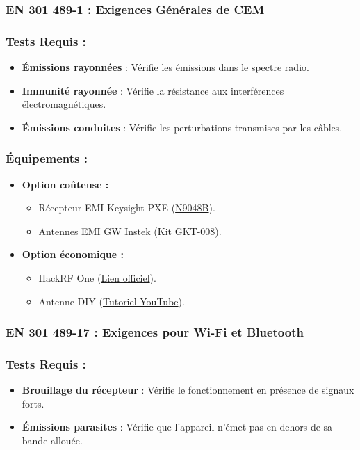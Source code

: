 \documentclass[a4paper,12pt]{article}
\begin{document}
\subsubsection{EN 301 489-1 : Exigences Générales de CEM}
\subsubsection*{Tests Requis :}
\begin{itemize}
    \item \textbf{Émissions rayonnées} : Vérifie les émissions dans le spectre radio.
    \item \textbf{Immunité rayonnée} : Vérifie la résistance aux interférences électromagnétiques.
    \item \textbf{Émissions conduites} : Vérifie les perturbations transmises par les câbles.
\end{itemize}

\subsubsection*{Équipements :}
\begin{itemize}
    \item \textbf{Option coûteuse :}
          \begin{itemize}
              \item Récepteur EMI Keysight PXE (\href{https://www.keysight.com/us/en/product/N9048B/pxe-emi-receiver-1-hz-44-ghz.html}{N9048B}).
              \item Antennes EMI GW Instek (\href{https://eleshop.fr/gw-instek-gkt-008-emi-probe-kit.html}{Kit GKT-008}).
          \end{itemize}
    \item \textbf{Option économique :}
          \begin{itemize}
              \item HackRF One (\href{https://greatscottgadgets.com/hackrf/one/}{Lien officiel}).
              \item Antenne DIY (\href{https://www.youtube.com/watch?v=2xy3Hm1_ZqI}{Tutoriel YouTube}).
          \end{itemize}
\end{itemize}

\subsubsection{EN 301 489-17 : Exigences pour Wi-Fi et Bluetooth}
\subsubsection*{Tests Requis :}
\begin{itemize}
    \item \textbf{Brouillage du récepteur} : Vérifie le fonctionnement en présence de signaux forts.
    \item \textbf{Émissions parasites} : Vérifie que l’appareil n’émet pas en dehors de sa bande allouée.
\end{itemize}
\end{document}

